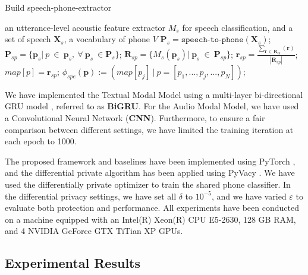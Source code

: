 \documentclass[11pt]{article}
\begin{document}
\begin{algorithm}[!htp]
\begin{algorithmic}[1]
	\caption{Build speech-phone-extractor}
	\label{alg:build-spe}
		\Require an utterance-level acoustic feature extractor ${M}_s$ for speech classification, and a set of speech $\mathbf{X}_s$, a vocabulary of phone $V$
		\State $\mathbf{P}_s = \texttt{speech-to-phone}(\mathbf{X}_s)$;
		    \State  $\mathbf{P}_{sp} = \{\mathbf{p}_s|~p~\in~\mathbf{p}_s,~\forall~\mathbf{p}_s~\in  \mathbf{P}_s\}$;
		    \State $\mathbf{R}_{sp} = \{M_s(\mathbf{p}_s)|~\mathbf{p}_s~\in~\mathbf{P}_{sp}\}$;
		    \State  $\mathbf{r}_{sp} = \frac{\sum_{\mathbf{r}~\in~\mathbf{R}_{sp}}(\mathbf{r})}{|\mathbf{R}_{sp}|}$;
		    \State  $map[p]=\mathbf{r}_{sp}$;
		\EndFor
		\State $\phi_{spe}(\mathbf{p}):=\left(map[p_j]~|~p=[p_1,...,p_j,...,p_N]\right)$;
\end{algorithmic}
\end{algorithm}

We have implemented the Textual Modal Model using a multi-layer bi-directional GRU model \cite{chung2014empirical}, referred to as \textbf{BiGRU}. For the Audio Modal Model, we have used a Convolutional Neural Network \cite{kim2014convolutional} (\textbf{CNN}). Furthermore, to ensure a fair comparison between different settings, we have limited the training iteration at each epoch to 1000.

The proposed framework and baselines have been implemented using PyTorch \cite{paszke2017automatic}, and the differential private algorithm has been applied using PyVacy \cite{waites2019pyvacy}. We have used the differentially private optimizer \cite{abadi2016deep} to train the shared phone classifier. In the differential privacy settings, we have set all $\delta$ to $10^{-5}$, and we have varied $\varepsilon$ to evaluate both protection and performance. All experiments have been conducted on a machine equipped with an Intel(R) Xeon(R) CPU E5-2630, 128 GB RAM, and 4 NVIDIA GeForce GTX TiTian XP GPUs.

\subsection{Experimental Results}
\end{document}
